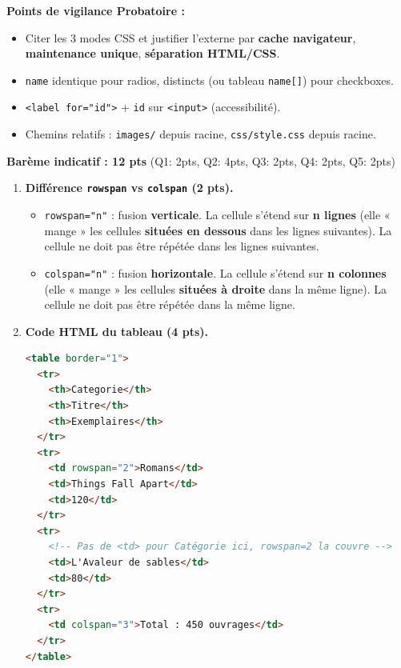 \documentclass[11pt]{article}
\begin{document}
\begin{corrige}
\textbf{Points de vigilance Probatoire :}
\begin{itemize}
  \item Citer les 3 modes CSS et justifier l'externe par \textbf{cache navigateur}, \textbf{maintenance unique}, \textbf{séparation HTML/CSS}.
  \item \texttt{name} identique pour radios, distincts (ou tableau \texttt{name[]}) pour checkboxes.
  \item \texttt{<label for="id">} + \texttt{id} sur \texttt{<input>} (accessibilité).
  \item Chemins relatifs : \texttt{images/} depuis racine, \texttt{css/style.css} depuis racine.
\end{itemize}
\end{corrige}

\begin{corrige}
\textbf{Barème indicatif : 12 pts} (Q1: 2pts, Q2: 4pts, Q3: 2pts, Q4: 2pts, Q5: 2pts)

\begin{enumerate}
  \item \textbf{Différence \texttt{rowspan} vs \texttt{colspan} (2 pts).}
  \begin{itemize}
    \item \texttt{rowspan="n"} : fusion \textbf{verticale}. La cellule s'étend sur \textbf{n lignes} (elle « mange » les cellules \textbf{situées en dessous} dans les lignes suivantes). La cellule ne doit pas être répétée dans les lignes suivantes.
    \item \texttt{colspan="n"} : fusion \textbf{horizontale}. La cellule s'étend sur \textbf{n colonnes} (elle « mange » les cellules \textbf{situées à droite} dans la même ligne). La cellule ne doit pas être répétée dans la même ligne.
  \end{itemize}
  
  \item \textbf{Code HTML du tableau (4 pts).}
\begin{lstlisting}[language=HTML]
<table border="1">
  <tr>
    <th>Categorie</th>
    <th>Titre</th>
    <th>Exemplaires</th>
  </tr>
  <tr>
    <td rowspan="2">Romans</td>
    <td>Things Fall Apart</td>
    <td>120</td>
  </tr>
  <tr>
    <!-- Pas de <td> pour Catégorie ici, rowspan=2 la couvre -->
    <td>L'Avaleur de sables</td>
    <td>80</td>
  </tr>
  <tr>
    <td colspan="3">Total : 450 ouvrages</td>
  </tr>
</table>
\end{lstlisting}
  

\end{enumerate}
\end{corrige}
\end{document}
